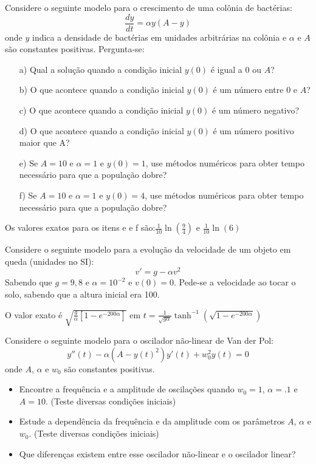 \begin{Exercise} Considere o seguinte modelo para o crescimento de uma colônia de bactérias:
$$\frac{dy}{dt}=\alpha y (A-y)$$
onde $y$ indica a densidade de bactérias em unidades arbitrárias na colônia e $\alpha$ e $A$ são constantes positivas.
Pergunta-se:
\begin{itemize}
\item[a)] Qual a solução quando a condição inicial $y(0)$ é igual a $0$ ou $A$?
\item[b)] O que acontece quando a condição inicial $y(0)$ é um número entre $0$ e $A$?
\item[c)] O que acontece quando a condição inicial $y(0)$ é um número negativo?
\item[d)] O que acontece quando a condição inicial $y(0)$ é um número positivo maior que A?
\item[e)] Se $A=10$ e $\alpha=1$ e $y(0)=1$, use métodos numéricos para obter tempo necessário para que a população dobre?
\item[f)] Se $A=10$ e $\alpha=1$ e $y(0)=4$, use métodos numéricos para obter tempo necessário para que a população dobre?
\end{itemize}
\end{Exercise}
\begin{Answer}
  \begin{tiny}
Os valores exatos para os itens e e f são:$\frac{1}{10}\ln\left(\frac{9}{4}\right)$ e $\frac{1}{10}\ln\left(6\right)$    
  \end{tiny}
\end{Answer}

\begin{Exercise} Considere o seguinte modelo para a evolução da velocidade de um objeto em queda (unidades no SI):
$$v'=g-\alpha v^2$$
Sabendo que $g=9,8$ e $\alpha=10^{-2}$ e $v(0)=0$. Pede-se a velocidade ao tocar o solo, sabendo que a altura inicial era 100.

\end{Exercise}
\begin{Answer}
  \begin{tiny}
O valor exato é $\sqrt{\frac{g}{\alpha}\left[1-e^{{-200\alpha}}\right]}$ em $t=\frac{1}{\sqrt{g\alpha}}\tanh^{-1}\left(\sqrt{1-e^{{-200\alpha}}}\right)$    
  \end{tiny}
\end{Answer}


\begin{Exercise} Considere o seguinte modelo para o oscilador não-linear de Van der Pol:
$$y''(t) - \alpha (A-y(t)^2)y'(t) + w_0^2y(t)=0$$
onde $A$, $\alpha$ e $w_0$ são constantes positivas.
\begin{itemize}
\item Encontre a frequência e a amplitude de oscilações quando $w_0=1$, $\alpha=.1$ e $A=10$. (Teste diversas condições iniciais)
\item Estude a dependência da frequência e da amplitude com os parâmetros  $A$, $\alpha$ e $w_0$. (Teste diversas condições iniciais)
\item Que diferenças existem entre esse oscilador não-linear e o oscilador linear?
\end{itemize}
\end{Exercise}

